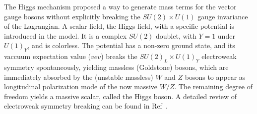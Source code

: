 The Higgs mechanism proposed a way to generate mass terms for the vector gauge bosons without explicitly breaking the $SU(2)\times U(1)$
gauge invariance of the Lagrangian. A scalar field, the Higgs field, with a specific potential is introduced in the model. It is a complex
$SU(2)$ doublet, with $Y=1$ under $U(1)_{Y}$, and is colorless.  The potential has a non-zero ground state, and its vaccuum expectation
value ($vev$) breaks the $SU(2)_{L}\times U(1)_{Y}$ electroweak symmetry spontaneously, yielding massless (Goldstone) bosons, which are 
immediately absorbed by the (unstable massless) $W$ and $Z$ bosons to appear as longitudinal polarization mode of the now massive $W/Z$.
The remaining degree of freedom yields a massive scalar, called the Higgs boson. A detailed review of electroweak symmetry breaking
can be found in Ref~\cite{Djouadi:2005gi}.


